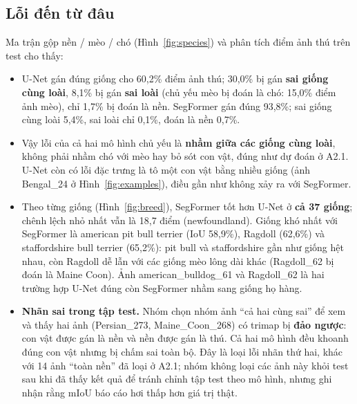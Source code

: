 \documentclass[12pt]{article}
\newcommand{\st}[1]{\textbf{#1}}
\begin{document}
\subsection{Lỗi đến từ đâu}
Ma trận gộp nền / mèo / chó (Hình~\ref{fig:species}) và phân tích điểm ảnh thú trên test cho thấy:
\begin{itemize}
  \item U-Net gán đúng giống cho 60,2\% điểm ảnh thú; 30,0\% bị gán \st{sai giống cùng loài}, 8,1\% bị gán \st{sai loài}
        (chủ yếu mèo bị đoán là chó: 15,0\% điểm ảnh mèo), chỉ 1,7\% bị đoán là nền. SegFormer gán đúng 93,8\%; sai
        giống cùng loài 5,4\%, sai loài chỉ 0,1\%, đoán là nền 0,7\%.
  \item Vậy lỗi của cả hai mô hình chủ yếu là \st{nhầm giữa các giống cùng loài}, không phải nhầm chó với mèo hay bỏ sót
        con vật, đúng như dự đoán ở A2.1. U-Net còn có lỗi đặc trưng là tô một con vật bằng nhiều giống (ảnh Bengal\_24 ở
        Hình~\ref{fig:examples}), điều gần như không xảy ra với SegFormer.
  \item Theo từng giống (Hình~\ref{fig:breed}), SegFormer tốt hơn U-Net ở \st{cả 37 giống}; chênh lệch nhỏ nhất vẫn là 18,7 điểm
        (newfoundland). Giống khó nhất với SegFormer là american pit bull terrier (IoU 58,9\%), Ragdoll (62,6\%) và
        staffordshire bull terrier (65,2\%): pit bull và staffordshire gần như giống hệt nhau, còn Ragdoll dễ lẫn với các
        giống mèo lông dài khác (Ragdoll\_62 bị đoán là Maine Coon). Ảnh american\_bulldog\_61 và Ragdoll\_62 là hai trường hợp U-Net đúng còn SegFormer nhầm sang
        giống họ hàng.
  \item \st{Nhãn sai trong tập test.} Nhóm chọn nhóm ảnh ``cả hai cùng sai'' để xem và thấy hai ảnh (Persian\_273,
        Maine\_Coon\_268) có trimap bị \st{đảo ngược}: con vật được gán là nền và nền được gán là thú. Cả hai mô hình đều
        khoanh đúng con vật nhưng bị chấm sai toàn bộ. Đây là loại lỗi nhãn thứ hai, khác với 14 ảnh ``toàn nền'' đã loại ở
        A2.1; nhóm không loại các ảnh này khỏi test sau khi đã thấy kết quả để tránh chỉnh tập test theo mô hình, nhưng
        ghi nhận rằng mIoU báo cáo hơi thấp hơn giá trị thật.
\end{itemize}

\end{document}
